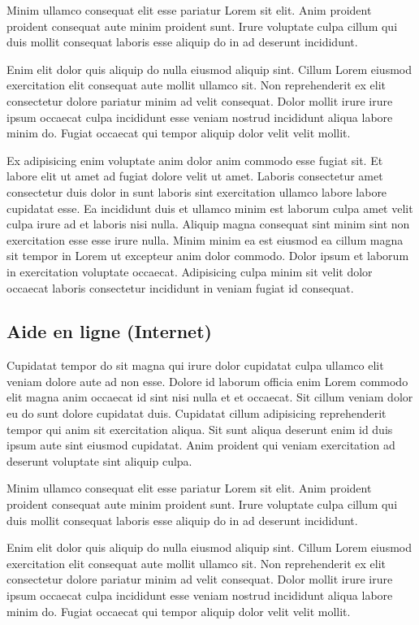 \documentclass[a4paper,10pt,french]{sphinxmanual}
\begin{document}
Minim ullamco consequat elit esse pariatur Lorem sit elit. Anim proident proident consequat aute minim proident sunt. Irure voluptate culpa cillum qui duis mollit consequat laboris esse aliquip do in ad deserunt incididunt.

Enim elit dolor quis aliquip do nulla eiusmod aliquip sint. Cillum Lorem eiusmod exercitation elit consequat aute mollit ullamco sit. Non reprehenderit ex elit consectetur dolore pariatur minim ad velit consequat. Dolor mollit irure irure ipsum occaecat culpa incididunt esse veniam nostrud incididunt aliqua labore minim do. Fugiat occaecat qui tempor aliquip dolor velit velit mollit.

Ex adipisicing enim voluptate anim dolor anim commodo esse fugiat sit. Et labore elit ut amet ad fugiat dolore velit ut amet. Laboris consectetur amet consectetur duis dolor in sunt laboris sint exercitation ullamco labore labore cupidatat esse. Ea incididunt duis et ullamco minim est laborum culpa amet velit culpa irure ad et laboris nisi nulla. Aliquip magna consequat sint minim sint non exercitation esse esse irure nulla. Minim minim ea est eiusmod ea cillum magna sit tempor in Lorem ut excepteur anim dolor commodo. Dolor ipsum et laborum in exercitation voluptate occaecat. Adipisicing culpa minim sit velit dolor occaecat laboris consectetur incididunt in veniam fugiat id consequat.


\subsection{Aide en ligne (Internet)}
\label{\detokenize{docs/refs/start/install/installation-win:aide-en-ligne-internet}}
Cupidatat tempor do sit magna qui irure dolor cupidatat culpa ullamco elit veniam dolore aute ad non esse. Dolore id laborum officia enim Lorem commodo elit magna anim occaecat id sint nisi nulla et et occaecat. Sit cillum veniam dolor eu do sunt dolore cupidatat duis. Cupidatat cillum adipisicing reprehenderit tempor qui anim sit exercitation aliqua. Sit sunt aliqua deserunt enim id duis ipsum aute sint eiusmod cupidatat. Anim proident qui veniam exercitation ad deserunt voluptate sint aliquip culpa.

Minim ullamco consequat elit esse pariatur Lorem sit elit. Anim proident proident consequat aute minim proident sunt. Irure voluptate culpa cillum qui duis mollit consequat laboris esse aliquip do in ad deserunt incididunt.

Enim elit dolor quis aliquip do nulla eiusmod aliquip sint. Cillum Lorem eiusmod exercitation elit consequat aute mollit ullamco sit. Non reprehenderit ex elit consectetur dolore pariatur minim ad velit consequat. Dolor mollit irure irure ipsum occaecat culpa incididunt esse veniam nostrud incididunt aliqua labore minim do. Fugiat occaecat qui tempor aliquip dolor velit velit mollit.
\end{document}
